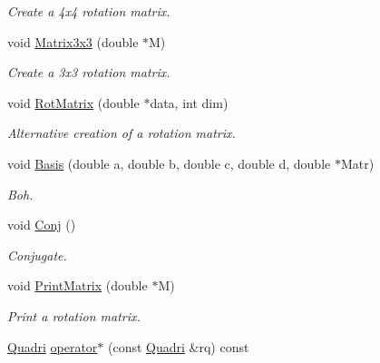 \begin{DoxyCompactItemize}
\begin{DoxyCompactList}\small\item\em Create a 4x4 rotation matrix. \end{DoxyCompactList}\item 
void \hyperlink{classQuadri_a74ee4f939f9baca1794ff7edb745cfaf}{Matrix3x3} (double $\ast$M)\hypertarget{classQuadri_a74ee4f939f9baca1794ff7edb745cfaf}{}\label{classQuadri_a74ee4f939f9baca1794ff7edb745cfaf}

\begin{DoxyCompactList}\small\item\em Create a 3x3 rotation matrix. \end{DoxyCompactList}\item 
void \hyperlink{classQuadri_ac6d5ee6f07fd55cda03804e371fbc6db}{Rot\+Matrix} (double $\ast$data, int dim)\hypertarget{classQuadri_ac6d5ee6f07fd55cda03804e371fbc6db}{}\label{classQuadri_ac6d5ee6f07fd55cda03804e371fbc6db}

\begin{DoxyCompactList}\small\item\em Alternative creation of a rotation matrix. \end{DoxyCompactList}\item 
void \hyperlink{classQuadri_a3b43a59660a1323f96a27abfa01d14c1}{Basis} (double a, double b, double c, double d, double $\ast$Matr)\hypertarget{classQuadri_a3b43a59660a1323f96a27abfa01d14c1}{}\label{classQuadri_a3b43a59660a1323f96a27abfa01d14c1}

\begin{DoxyCompactList}\small\item\em Boh. \end{DoxyCompactList}\item 
void \hyperlink{classQuadri_a3a27690dd6fb11d4799dcce8f0410a07}{Conj} ()\hypertarget{classQuadri_a3a27690dd6fb11d4799dcce8f0410a07}{}\label{classQuadri_a3a27690dd6fb11d4799dcce8f0410a07}

\begin{DoxyCompactList}\small\item\em Conjugate. \end{DoxyCompactList}\item 
void \hyperlink{classQuadri_aa859dc583567c5bcd931fa9b7ea85a67}{Print\+Matrix} (double $\ast$M)\hypertarget{classQuadri_aa859dc583567c5bcd931fa9b7ea85a67}{}\label{classQuadri_aa859dc583567c5bcd931fa9b7ea85a67}

\begin{DoxyCompactList}\small\item\em Print a rotation matrix. \end{DoxyCompactList}\item 
\hyperlink{classQuadri}{Quadri} \hyperlink{classQuadri_a5c3fd3fea1d46ac23e079d42af170d62}{operator$\ast$} (const \hyperlink{classQuadri}{Quadri} \&rq) const \hypertarget{classQuadri_a5c3fd3fea1d46ac23e079d42af170d62}{}\label{classQuadri_a5c3fd3fea1d46ac23e079d42af170d62}


\end{DoxyCompactItemize}
